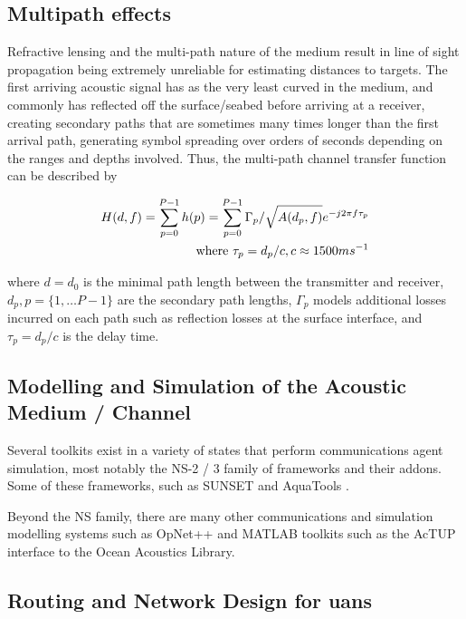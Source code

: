 \subsection{Multipath effects}

Refractive lensing and the multi-path nature of the medium result in line of sight propagation being extremely unreliable for estimating distances to targets.
The first arriving acoustic signal has as the very least curved in the medium, and commonly has reflected off the surface/seabed before arriving at a receiver, creating secondary paths that are sometimes many times longer than the first arrival path, generating symbol spreading over orders of seconds depending on the ranges and depths involved.
Thus, the multi-path channel transfer function can be described by 

\begin{align}
  \label{eq:acomultipath}
  H(d,f) =\sum_{p=0}^{P-1} h(p) = \sum_{p=0}^{P-1} \Gamma_p / \sqrt{A(d_p,f)}e^{-j 2 \pi f \tau_p} \\
  \text{where } \tau_p = d_p/c, c \approx 1500 ms^{-1} \notag
\end{align}

where $d=d_0$ is the minimal path length between the transmitter and receiver, $d_p,p=\{1,\dots P-1\}$ are the secondary path lengths, $\Gamma_p$ models additional losses incurred on each path such as reflection losses at the surface interface, and $\tau_p = d_p/c$ is the delay time.




\subsection{Modelling and Simulation of the Acoustic Medium / Channel}

Several toolkits exist in a variety of states that perform communications agent simulation, most notably the NS-2 / 3 family of frameworks and their addons.
Some of these frameworks, such as SUNSET \cite{Petrioli2012a} and AquaTools \cite{Sehgal2010}.

Beyond the NS family, there are many other communications and simulation modelling systems such as OpNet++\cite{Chang1999} and MATLAB toolkits such as the AcTUP interface to the Ocean Acoustics Library.




\subsection{Routing and Network Design for \glspl{uan}}

